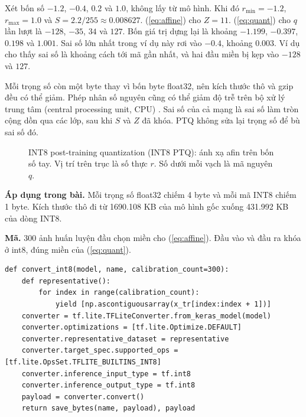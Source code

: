 \documentclass[13pt,a4paper]{article}
\begin{document}
Xét bốn số \(-1.2\), \(-0.4\), \(0.2\) và \(1.0\), không lấy từ mô hình.
Khi đó \(r_{\min} = -1.2\), \(r_{\max} = 1.0\) và \(S = 2.2/255 \approx 0.008627\).
(\ref{eq:affine}) cho \(Z = 11\).
(\ref{eq:quant}) cho \(q\) lần lượt là \(-128\), \(-35\), \(34\) và \(127\).
Bốn giá trị dựng lại là khoảng \(-1.199\), \(-0.397\), \(0.198\) và \(1.001\).
Sai số lớn nhất trong ví dụ này rơi vào \(-0.4\), khoảng \(0.003\).
Ví dụ cho thấy sai số là khoảng cách tới mã gần nhất, và hai đầu miền bị kẹp vào \(-128\) và \(127\).

Mỗi trọng số còn một byte thay vì bốn byte float32, nên kích thước thô và gzip đều có thể giảm.
Phép nhân số nguyên cũng có thể giảm độ trễ trên bộ xử lý trung tâm (central processing unit, CPU) \cite{jacob2018}.
Sai số của cả mạng là sai số làm tròn cộng dồn qua các lớp, sau khi \(S\) và \(Z\) đã khóa.
PTQ không sửa lại trọng số để bù sai số đó.

\begin{figure}[H]
\centering
{}
\caption{INT8 post-training quantization (INT8 PTQ): ánh xạ afin trên bốn số tay. Vị trí trên trục là số thực $r$. Số dưới mỗi vạch là mã nguyên $q$.}
\label{fig:int8-mech}
\end{figure}

\noindent\textbf{Áp dụng trong bài.}
Mỗi trọng số float32 chiếm 4 byte và mỗi mã INT8 chiếm 1 byte.
Kích thước thô đi từ 1690.108 KB của mô hình gốc xuống 431.992 KB của dòng INT8.

\noindent\textbf{Mã.}
300 ảnh huấn luyện đầu chọn miền cho (\ref{eq:affine}).
Đầu vào và đầu ra khóa ở int8, đúng miền của (\ref{eq:quant}).

\nopagebreak
{\fontsize{8}{9.2}\selectfont
\begin{verbatim}
def convert_int8(model, name, calibration_count=300):
    def representative():
        for index in range(calibration_count):
            yield [np.ascontiguousarray(x_tr[index:index + 1])]
    converter = tf.lite.TFLiteConverter.from_keras_model(model)
    converter.optimizations = [tf.lite.Optimize.DEFAULT]
    converter.representative_dataset = representative
    converter.target_spec.supported_ops = [tf.lite.OpsSet.TFLITE_BUILTINS_INT8]
    converter.inference_input_type = tf.int8
    converter.inference_output_type = tf.int8
    payload = converter.convert()
    return save_bytes(name, payload), payload
\end{verbatim}
}
\end{document}
